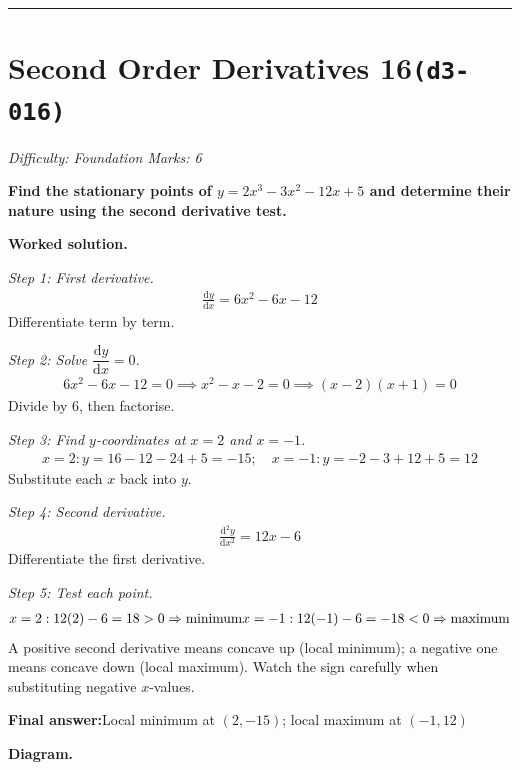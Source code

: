 \documentclass[11pt]{article}
\newcommand{\question}[1]{\par\medskip\noindent\textbf{#1}\par}
\begin{document}
\medskip\hrule

\section*{Second Order Derivatives 16\quad\small\texttt{(d3-016)}}
\textit{Difficulty: Foundation \quad\textbar\quad Marks: 6}

\question{Find the stationary points of \( y = 2x^3 - 3x^2 - 12x + 5 \) and determine their nature using the second derivative test.}

\textbf{Worked solution.}

\textit{Step 1: First derivative.}
\[\begin{gathered}
\frac{\mathrm{d}y}{\mathrm{d}x} = 6x^2 - 6x - 12
\end{gathered}\]
Differentiate term by term.

\textit{Step 2: Solve \( \dfrac{\mathrm{d}y}{\mathrm{d}x} = 0 \).}
\[\begin{gathered}
6x^2 - 6x - 12 = 0 \implies x^2 - x - 2 = 0 \implies (x-2)(x+1) = 0
\end{gathered}\]
Divide by 6, then factorise.

\textit{Step 3: Find \( y \)-coordinates at \( x = 2 \) and \( x = -1 \).}
\[\begin{gathered}
x=2: y = 16 - 12 - 24 + 5 = -15; \quad x=-1: y = -2 - 3 + 12 + 5 = 12
\end{gathered}\]
Substitute each \( x \) back into \( y \).

\textit{Step 4: Second derivative.}
\[\begin{gathered}
\frac{\mathrm{d}^2y}{\mathrm{d}x^2} = 12x - 6
\end{gathered}\]
Differentiate the first derivative.

\textit{Step 5: Test each point.}
\[\begin{gathered}
x=2: 12(2)-6 = 18 > 0 \Rightarrow \text{minimum} \newline x=-1: 12(-1)-6 = -18 < 0 \Rightarrow \text{maximum}
\end{gathered}\]
A positive second derivative means concave up (local minimum); a negative one means concave down (local maximum). Watch the sign carefully when substituting negative \(x\)-values.

\begin{answerbox}
\textbf{Final answer:}\quad Local minimum at \(\displaystyle  (2, -15) \); local maximum at \(\displaystyle  (-1, 12) \)
\end{answerbox}
\textbf{Diagram.}
\end{document}
